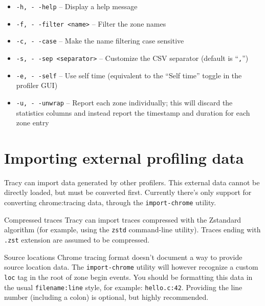 \documentclass[hidelinks,titlepage,a4paper]{article}
\begin{document}
\begin{itemize}
  \item \texttt{-h, -\hspace{-1.25ex} -help} -- Display a help message
  \item \texttt{-f, -\hspace{-1.25ex} -filter <name>} -- Filter the zone names
  \item \texttt{-c, -\hspace{-1.25ex} -case} -- Make the name filtering case sensitive
  \item \texttt{-s, -\hspace{-1.25ex} -sep <separator>} -- Customize the CSV separator (default is ``\texttt{,}'')
  \item \texttt{-e, -\hspace{-1.25ex} -self} -- Use self time (equivalent to the ``Self time'' toggle in the profiler GUI)
  \item \texttt{-u, -\hspace{-1.25ex} -unwrap} -- Report each zone individually; this will discard the statistics columns and instead report the timestamp and duration for each zone entry
\end{itemize}

\section{Importing external profiling data}
\label{importingdata}

Tracy can import data generated by other profilers. This external data cannot be directly loaded, but must be converted first. Currently there's only support for converting chrome:tracing data, through the \texttt{import-chrome} utility.

\begin{bclogo}[
noborder=true,
couleur=black!5,
logo=\bclampe
]{Compressed traces}
Tracy can import traces compressed with the Zstandard algorithm (for example, using the \texttt{zstd} command-line utility). Traces ending with \texttt{.zst} extension are assumed to be compressed.
\end{bclogo}

\begin{bclogo}[
noborder=true,
couleur=black!5,
logo=\bclampe
]{Source locations}
Chrome tracing format doesn't document a way to provide source location data. The \texttt{import-chrome} utility will however recognize a custom \texttt{loc} tag in the root of zone begin events. You should be formatting this data in the usual \texttt{filename:line} style, for example: \texttt{hello.c:42}. Providing the line number (including a colon) is optional, but highly recommended.
\end{bclogo}
\end{document}
